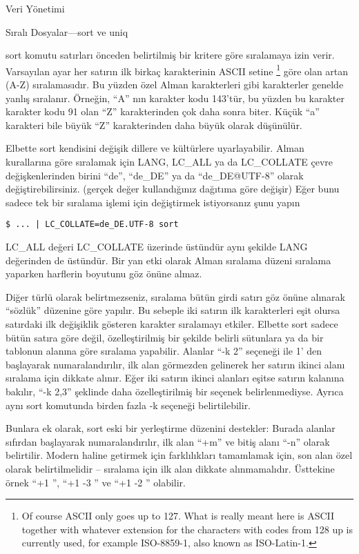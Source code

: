 \begin{section}{Veri Yönetimi}
\begin{subsection}{Sıralı Dosyalar—sort ve uniq}

sort komutu satırları önceden belirtilmiş bir kritere göre sıralamaya izin verir. Varsayılan ayar her satırın ilk birkaç karakterinin ASCII setine
\footnote{ Of course ASCII only goes up to 127. What is really meant here is ASCII together with whatever extension for the characters with codes from 128 up is currently used, for example ISO-8859-1, also known as ISO-Latin-1.} göre olan artan (A-Z) sıralamasıdır. Bu yüzden özel Alman karakterleri gibi karakterler genelde yanlış sıralanır. Örneğin, “A” nın karakter kodu 143'tür, bu yüzden bu karakter karakter kodu 91 olan “Z” karakterinden çok daha sonra biter. Küçük “a” karakteri bile büyük “Z” karakterinden daha büyük olarak düşünülür.

Elbette sort kendisini değişik dillere ve kültürlere uyarlayabilir. Alman kurallarına göre sıralamak için LANG, LC\_ALL ya da LC\_COLLATE  çevre değişkenlerinden birini “de”, “de\_DE” ya da “de\_DE@UTF-8” olarak değiştirebilirsiniz. (gerçek değer kullandığınız dağıtıma göre değişir) Eğer bunu sadece tek bir sıralama işlemi için değiştirmek istiyorsanız şunu yapın
\begin{verbatim}
$ ... | LC_COLLATE=de_DE.UTF-8 sort
\end{verbatim}

LC\_ALL değeri LC\_COLLATE üzerinde üstündür aynı şekilde LANG değerinden de üstündür. Bir yan etki olarak Alman sıralama düzeni sıralama yaparken harflerin boyutunu göz önüne almaz.


Diğer türlü olarak belirtmezseniz, sıralama bütün girdi satırı göz önüne alınarak “sözlük” düzenine göre yapılır. Bu sebeple iki satırın ilk karakterleri eşit olursa satırdaki ilk değişiklik gösteren karakter sıralamayı etkiler. Elbette sort sadece bütün satıra göre değil, özelleştirilmiş bir şekilde belirli sütunlara ya da bir tablonun alanına göre sıralama yapabilir. Alanlar “-k 2” seçeneği ile 1' den başlayarak numaralandırılır, ilk alan görmezden gelinerek her satırın ikinci alanı sıralama için dikkate alınır. Eğer iki satırın ikinci alanları eşitse satırın kalanına bakılır, “-k 2,3” şeklinde daha özelleştirilmiş bir seçenek belirlenmediyse. Ayrıca aynı sort komutunda birden fazla -k seçeneği belirtilebilir. 

Bunlara ek olarak, sort eski bir yerleştirme düzenini destekler: Burada alanlar sıfırdan başlayarak numaralandırılır, ilk alan “+m” ve bitiş alanı “-n” olarak belirtilir. Modern haline getirmek için farklılıkları tamamlamak için, son alan özel olarak belirtilmelidir – sıralama için ilk alan dikkate alınmamalıdır. Üsttekine örnek “+1 ”, “+1 -3 ” ve “+1 -2 ” olabilir. 


\end{subsection}
\end{section}
